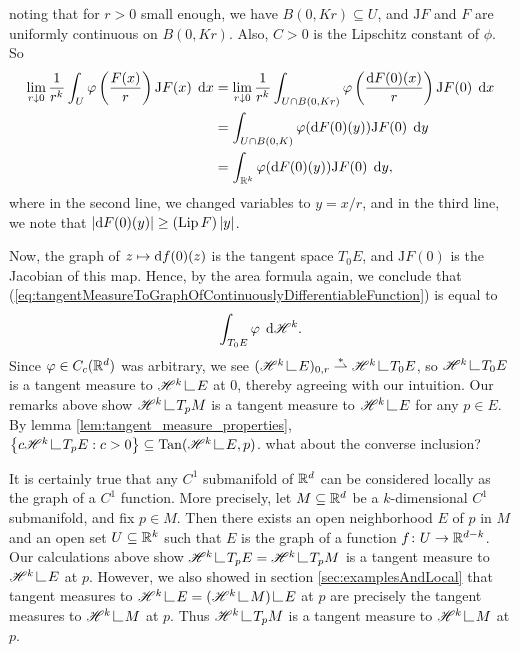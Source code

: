 noting that for $r > 0$ small enough, we have $B(0,Kr) \subseteq U$, and $\mathrm{J}F$ and $F$ are uniformly continuous on $B(0,Kr)$. Also, $C > 0$ is the Lipschitz constant of $\phi$. So
\begin{equation} \begin{aligned} \label{eq:tangentMeasureToGraphOfContinuouslyDifferentiableFunction}
    \lim_{r \downarrow 0} \frac{1}{r^k} \int_U \varphi\left( { \frac{F(x)}{r} } \right) \mathrm{J}F(x) \; \operatorname{d}\!{x} &= \lim_{r \downarrow 0} \frac{1}{r^k} \int_{U \cap B(0,Kr)} \varphi\left( { \frac{\operatorname{d}\!{F}(0)(x)}{r} } \right) \mathrm{J}F(0) \; \operatorname{d}\!{x} \\
    &= \int_{U \cap B(0,K)} \varphi( \operatorname{d}\!{F}(0)(y) ) \mathrm{J}F(0) \; \operatorname{d}\!{y} \\
    &= \int_{\mathbb{R}^k} \varphi( \operatorname{d}\!{F}(0)(y) ) \mathrm{J}F(0) \; \operatorname{d}\!{y},
\end{aligned} \end{equation}
where in the second line, we changed variables to $y = x/r$, and in the third line, we note that $\left\vert {\ensuremath{\operatorname{d}\!{F}}(0)(y)} \right\vert \geq (\operatorname{Lip}{F})\left\vert {y} \right\vert$.

Now, the graph of $z \mapsto \operatorname{d}\!{f}(0)(z)$ is the tangent space $T_{0} E$, and $\mathrm{J}F(0)$ is the Jacobian of this map. Hence, by the area formula again, we conclude that (\ref{eq:tangentMeasureToGraphOfContinuouslyDifferentiableFunction}) is equal to 
\begin{equation}
    \int_{T_{0}E} \varphi \; \operatorname{d}\!{\mathscr{H}}^k.
\end{equation}
Since $\varphi \in C_c(\mathbb{R}^d)$ was arbitrary, we see $(\scrH^k \restrict E)_{0,r} \weakstar \scrH^k \restrict T_0 E$, so $\scrH^k \restrict T_{0}E$ is a tangent measure to $\scrH^k \restrict E$ at $0$, thereby agreeing with our intuition. Our remarks above show $\scrH^k \restrict T_p M$ is a tangent measure to $\scrH^k \restrict E$ for any $p \in E$. By lemma \ref{lem:tangent_measure_properties}, $\set{ c \scrH^k \restrict T_pE : c > 0 } \subseteq \Tan(\scrH^k \restrict E, p)$. {\color{red} what about the converse inclusion?}

It is certainly true that any $C^1$ submanifold of $\mathbb{R}^d$ can be considered locally as the graph of a $C^1$ function. More precisely, let $M \subseteq \mathbb{R}^d$ be a $k$-dimensional $C^1$ submanifold, and fix $p \in M$. Then there exists an open neighborhood $E$ of $p$ in $M$ and an open set $U \subseteq \mathbb{R}^k$ such that $E$ is the graph of a function $f \colon U \to \mathbb{R}^{d-k}$. Our calculations above show $\scrH^k \restrict T_p E = \scrH^k \restrict T_p M$ is a tangent measure to $\scrH^k \restrict E$ at $p$. However, we also showed in section \ref{sec:examplesAndLocal} that tangent measures to $\scrH^k \restrict E = (\scrH^k \restrict M) \restrict E$ at $p$ are precisely the tangent measures to $\scrH^k \restrict M$ at $p$. Thus $\scrH^k \restrict T_pM$ is a tangent measure to $\scrH^k \restrict M$ at $p$.

